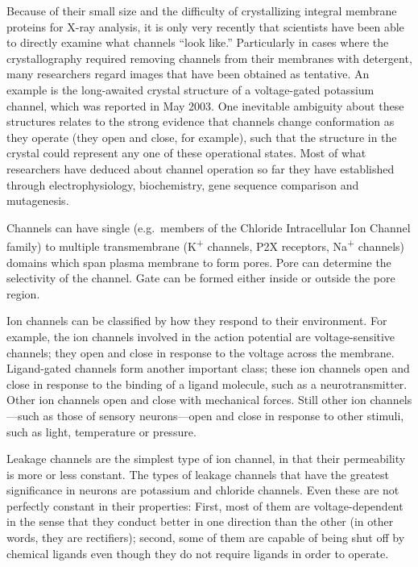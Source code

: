 \documentclass[]{book}
\begin{document}
Because of their small size and the difficulty of crystallizing integral membrane proteins for X-ray analysis, it is only very recently that scientists have been able to directly examine what channels ``look like.'' Particularly in cases where the crystallography required removing channels from their membranes with detergent, many researchers regard images that have been obtained as tentative. An example is the long-awaited crystal structure of a voltage-gated potassium channel, which was reported in May 2003. One inevitable ambiguity about these structures relates to the strong evidence that channels change conformation as they operate (they open and close, for example), such that the structure in the crystal could represent any one of these operational states. Most of what researchers have deduced about channel operation so far they have established through electrophysiology, biochemistry, gene sequence comparison and mutagenesis.

Channels can have single (e.g.~members of the Chloride Intracellular Ion Channel family) to multiple transmembrane (K\textsuperscript{+} channels, P2X receptors, Na\textsuperscript{+} channels) domains which span plasma membrane to form pores. Pore can determine the selectivity of the channel. Gate can be formed either inside or outside the pore region.

Ion channels can be classified by how they respond to their environment. For example, the ion channels involved in the action potential are voltage-sensitive channels; they open and close in response to the voltage across the membrane. Ligand-gated channels form another important class; these ion channels open and close in response to the binding of a ligand molecule, such as a neurotransmitter. Other ion channels open and close with mechanical forces. Still other ion channels---such as those of sensory neurons---open and close in response to other stimuli, such as light, temperature or pressure.

Leakage channels are the simplest type of ion channel, in that their permeability is more or less constant. The types of leakage channels that have the greatest significance in neurons are potassium and chloride channels. Even these are not perfectly constant in their properties: First, most of them are voltage-dependent in the sense that they conduct better in one direction than the other (in other words, they are rectifiers); second, some of them are capable of being shut off by chemical ligands even though they do not require ligands in order to operate.
\end{document}
